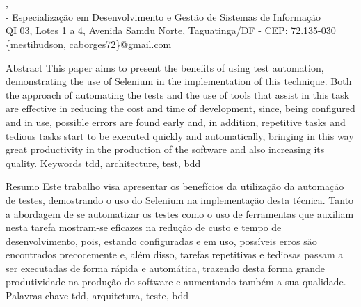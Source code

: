 


  
  
  




  \clearpage

  \thispagestyle{empty}

  \begin{center}
    \titulo\\
    \subtitulo\\
    \autor, \orientador\\
    \instituicao - Especialização em Desenvolvimento e Gestão de Sistemas de
    Informação\\
    QI 03, Lotes 1 a 4, Avenida Samdu Norte, Taguatinga/DF - CEP: 72.135-030\\
    \{mestihudson, caborges72\}@gmail.com
  \end{center}

  \resumo
    {Abstract}
    {This paper aims to present the benefits of using test automation, demonstrating the use of Selenium in the implementation of this technique. Both the approach of automating the tests and the use of tools that assist in this task are effective in reducing the cost and time of development, since, being configured and in use, possible errors are found early and, in addition, repetitive tasks and tedious tasks start to be executed quickly and automatically, bringing in this way great productivity in the production of the software and also increasing its quality.}
    {Keywords}
    {tdd, architecture, test, bdd}

  \resumo
    {Resumo}
    {Este trabalho visa apresentar os benefícios da utilização da automação de testes, demostrando o uso do Selenium na implementação desta técnica. Tanto a abordagem de se automatizar os testes como o uso de ferramentas que auxiliam nesta tarefa mostram-se eficazes na redução de custo e tempo de desenvolvimento, pois, estando configuradas e em uso, possíveis erros são encontrados precocemente e, além disso, tarefas repetitivas e tediosas passam a ser executadas de forma rápida e automática, trazendo desta forma grande produtividade na produção do software e aumentando também a sua qualidade.}
    {Palavras-chave}
    {tdd, arquitetura, teste, bdd}

